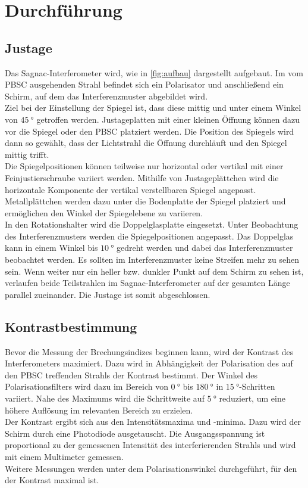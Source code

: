 \section{Durchführung}
\label{sec:Durchführung}

\subsection{Justage}
Das Sagnac-Interferometer wird, wie in \autoref{fig:aufbau} dargestellt aufgebaut.
Im vom PBSC ausgehenden Strahl befindet sich ein Polarisator und anschließend ein Schirm, auf dem das Interferenzmuster abgebildet wird.
\\
Ziel bei der Einstellung der Spiegel ist, dass diese mittig und unter einem Winkel von $\qty{45}{\degree}$ getroffen werden.
Justageplatten mit einer kleinen Öffnung können dazu vor die Spiegel oder den PBSC platziert werden.
Die Position des Spiegels wird dann so gewählt, dass der Lichtstrahl die Öffnung durchläuft und den Spiegel mittig trifft.
\\
Die Spiegelpositionen können teilweise nur horizontal oder vertikal mit einer Feinjustierschraube variiert werden.
Mithilfe von Justageplättchen wird die horizontale Komponente der vertikal verstellbaren Spiegel angepasst.
Metallplättchen werden dazu unter die Bodenplatte der Spiegel platziert und ermöglichen den Winkel der Spiegelebene zu variieren.
\\
In den Rotationshalter wird die Doppelglasplatte eingesetzt.
Unter Beobachtung des Interferenzmusters werden die Spiegelpositionen angepasst.
Das Doppelglas kann in einem Winkel bis $\qty{10}{\degree}$ gedreht werden und dabei das Interferenzmuster beobachtet werden.
Es sollten im Interferenzmuster keine Streifen mehr zu sehen sein.
Wenn weiter nur ein heller bzw. dunkler Punkt auf dem Schirm zu sehen ist, verlaufen beide Teilstrahlen im Sagnac-Interferometer auf der gesamten Länge parallel zueinander.
Die Justage ist somit abgeschlossen.

\subsection{Kontrastbestimmung}
Bevor die Messung der Brechungsindizes beginnen kann, wird der Kontrast des Interferometers maximiert.
Dazu wird in Abhängigkeit der Polarisation des auf den PBSC treffenden Strahls der Kontrast bestimmt.
Der Winkel des Polarisationsfilters wird dazu im Bereich von $\qty{0}{\degree}$ bis $\qty{180}{\degree}$ in $\qty{15}{\degree}$-Schritten variiert.
Nahe des Maximums wird die Schrittweite auf $\qty{5}{\degree}$ reduziert, um eine höhere Auflösung im relevanten Bereich zu erzielen.
\\
Der Kontrast ergibt sich aus den Intensitätsmaxima und -minima.
Dazu wird der Schirm durch eine Photodiode ausgetauscht.
Die Ausgangsspannung ist proportional zu der gemessenen Intensität des interferierenden Strahls und wird mit einem Multimeter gemessen.
\\
Weitere Messungen werden unter dem Polarisationswinkel durchgeführt, für den der Kontrast maximal ist.

